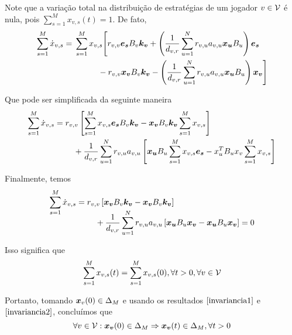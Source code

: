 Note que a variação total na distribuição de estratégias de um jogador $v\in\mathcal{V}$ é nula, pois $\sum_{s=1}^M x_{v,s}(t)=1$. De fato,
\begin{equation}
    \sum^M_{s=1}\Dot{x}_{v,s}= \!\begin{multlined}[t]
        \sum^M_{s=1}x_{v,s}\Biggl[
        r_{v,v}\BS{e_s} B_v \BS{k_v}+\left(\frac{1}{d_{v,r}}\sum_{u=1}^N 
        r_{v,u}a_{v,u}\BS{x_u} B_u \right) \BS{e_s} \\
        -r_{v,v}\BS{x_v} B_v \BS{k_v}-\left(\frac{1}{d_{v,r}}\sum_{u=1}^N 
        r_{v,u}a_{v,u}\BS{x_u} B_u\right) \BS{x_v}
        \Biggr]
    \end{multlined}
\end{equation}

Que pode ser simplificada da seguinte maneira
\begin{equation}
    \sum^M_{s=1}\Dot{x}_{v,s}= \!\begin{multlined}[t]
        r_{v,v}\left[\sum^M_{s=1}x_{v,s}\BS{e_s} B_v \BS{k_v}-\BS{x_v} B_v \BS{k_v} \sum^M_{s=1}x_{v,s}\right]\\
        +\frac{1}{d_{v,r}}\sum_{u=1}^N r_{v,u}a_{v,u}\left[\BS{x_u} B_u \sum^M_{s=1} x_{v,s} \BS{e_s}
        -x_u^TB_u x_v\sum^M_{s=1}x_{v,s}
        \right]
    \end{multlined}
\end{equation}

Finalmente, temos
\begin{equation}
    \sum^M_{s=1}\Dot{x}_{v,s}= \!\begin{multlined}[t]
        r_{v,v}\left[\BS{x_v} B_v \BS{k_v} - \BS{x_v} B_v \BS{k_v}\right] \\
        +\frac{1}{d_{v,r}}\sum_{u=1}^N r_{v,u}a_{v,u}\left[\BS{x_u} B_u \BS{x_v}
        -\BS{x_u} B_u \BS{x_v}
        \right] = 0
    \end{multlined}
\end{equation}

Isso significa que
\begin{equation}
\label{invariancia2}
    \sum^M_{s=1}x_{v,s}(t)=\sum^M_{s=1}x_{v,s}(0),\forall t>0,\forall v\in\mathcal{V}
\end{equation}

Portanto, tomando $\boldsymbol{x}_v(0)\in\Delta_M$ e usando os resultados $\eqref{invariancia1}$ e $\eqref{invariancia2}$, concluímos que
\begin{equation}
    \label{invariancia}
    \forall v\in\mathcal{V}:\boldsymbol{x_v}(0)\in\Delta_M\Rightarrow \boldsymbol{x_v}(t)\in\Delta_M, \forall t>0
\end{equation}


